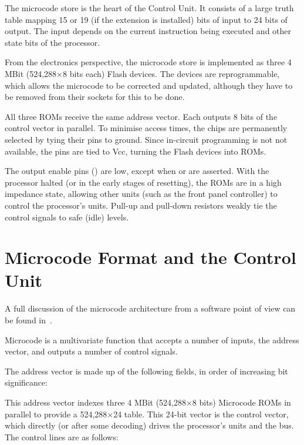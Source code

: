 The microcode store is the heart of the Control Unit. It consists of a large
truth table mapping 15 or 19 (if the  extension is installed) bits of
input to 24 bits of output. The input depends on the current instruction being
executed and other state bits of the processor.

From the electronics perspective, the microcode store is implemented as three 4
MBit (524,288×8 bits each) Flash devices. The devices are reprogrammable, which
allows the microcode to be corrected and updated, although they have to be
removed from their sockets for this to be done.

All three ROMs receive the same address vector. Each outputs 8 bits of the
control vector in parallel. To minimise access times, the chips are permanently
selected by tying their  pins to ground. Since in-circuit programming is
not not available, the  pins are tied to Vcc, turning the Flash devices
into ROMs.

The output enable pins () are low, except when  or 
are asserted. With the processor halted (or in the early stages of resetting),
the ROMs are in a high impedance state, allowing other units (such as the front
panel controller) to control the processor's units. Pull-up and pull-down
resistors weakly tie the control signals to safe (idle) levels.


\section{Microcode Format and the Control Unit}
\label{sec:microcode-format}

A full discussion of the microcode architecture from a software point of
view can be found in~.

Microcode is a multivariate function that accepts a number of inputs, the
address vector, and outputs a number of control signals. 

The address vector is made up of the following fields, in order of increasing
bit significance:



This address vector indexes three 4 MBit (524,288×8 bits) Microcode ROMs in
parallel to provide a 524,288×24 table. This 24-bit vector is the control
vector, which directly (or after some decoding) drives the processor's units
and the bus. The control lines are as follows:




